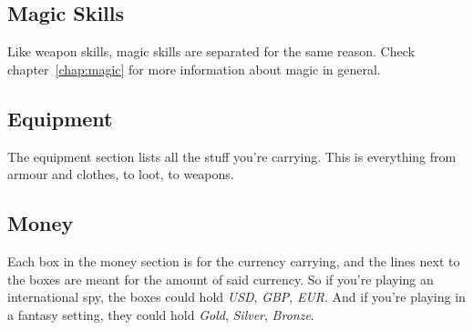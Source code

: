 \subsection{Magic Skills}
Like weapon skills, magic skills are separated for the same reason.
Check chapter~\ref{chap:magic} for more information about magic in general.

\subsection{Equipment}
The equipment section lists all the stuff you're carrying.
This is everything from armour and clothes, to loot, to weapons.

\subsection{Money}
Each box in the money section is for the currency carrying, and the lines next to the boxes are meant for the amount of said currency.
So if you're playing an international spy, the boxes could hold \textit{USD}, \textit{GBP}, \textit{EUR}.
And if you're playing in a fantasy setting, they could hold \textit{Gold}, \textit{Silver}, \textit{Bronze}.
